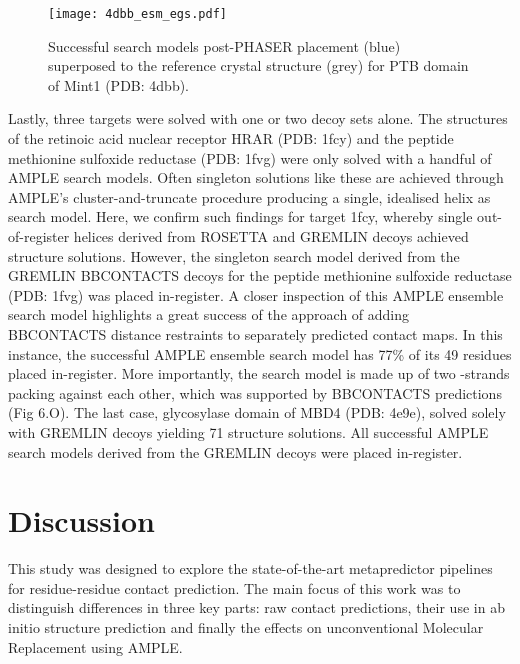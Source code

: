 \begin{figure}
  \centering
  \texttt{[image: 4dbb\_esm\_egs.pdf]}
  \caption{Successful search models post-PHASER placement (blue) superposed to the reference crystal structure (grey) for PTB domain of Mint1 (PDB: 4dbb).}
  \label{fig:4dbb_esm_egs}
\end{figure}


Lastly, three targets were solved with one or two decoy sets alone. The structures of the retinoic acid nuclear receptor HRAR (PDB: 1fcy) and the peptide methionine sulfoxide reductase (PDB: 1fvg) were only solved with a handful of AMPLE search models. Often singleton solutions like these are achieved through AMPLE’s cluster-and-truncate procedure producing a single, idealised helix as search model. Here, we confirm such findings for target 1fcy, whereby single out-of-register helices derived from ROSETTA and GREMLIN decoys achieved structure solutions. However, the singleton search model derived from the GREMLIN BBCONTACTS decoys for the peptide methionine sulfoxide reductase (PDB: 1fvg) was placed in-register. A closer inspection of this AMPLE ensemble search model highlights a great success of the approach of adding BBCONTACTS distance restraints to separately predicted contact maps. In this instance, the successful AMPLE ensemble search model has 77\% of its 49 residues placed in-register. More importantly, the search model is made up of two \textbeta-strands packing against each other, which was supported by BBCONTACTS predictions (Fig 6.O). The last case, glycosylase domain of MBD4 (PDB: 4e9e), solved solely with GREMLIN decoys yielding 71 structure solutions. All successful AMPLE search models derived from the GREMLIN decoys were placed in-register.

\section{Discussion}
This study was designed to explore the state-of-the-art metapredictor pipelines for residue-residue contact prediction. The main focus of this work was to distinguish differences in three key parts: raw contact predictions, their use in  ab initio structure prediction and finally the effects on unconventional Molecular Replacement using AMPLE.

